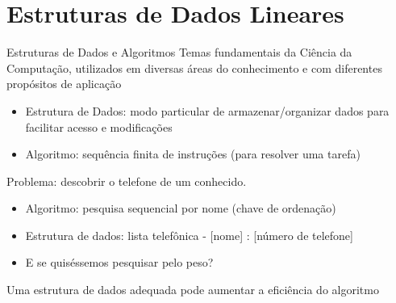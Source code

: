 
\section{Estruturas de Dados Lineares}
\begin{frame}[label=notas]
	\begin{exampleblock}{Estruturas de Dados e Algoritmos}
		Temas fundamentais da Ciência da Computação, utilizados em diversas áreas do conhecimento e com diferentes propósitos de aplicação
		\begin{itemize}
			\item Estrutura de Dados: modo particular de armazenar/organizar dados 
			para facilitar acesso e modificações
			\item Algoritmo: sequência finita de instruções (para resolver uma tarefa)
		\end{itemize}
	\end{exampleblock}
	\pause\vfill
	Problema: descobrir o telefone de um conhecido.
	\begin{itemize}
		\item Algoritmo: pesquisa sequencial por nome (\alert<2>{chave de ordenação})	
		\item Estrutura de dados: lista telefônica - {[nome] : [número de telefone]}
		\pause
		\item E se quiséssemos pesquisar pelo peso?
	\end{itemize}
	\pause\vfill
	\begin{beamerboxesrounded}{}
		Uma estrutura de dados adequada pode aumentar a eficiência do algoritmo
	\end{beamerboxesrounded}
\end{frame}

